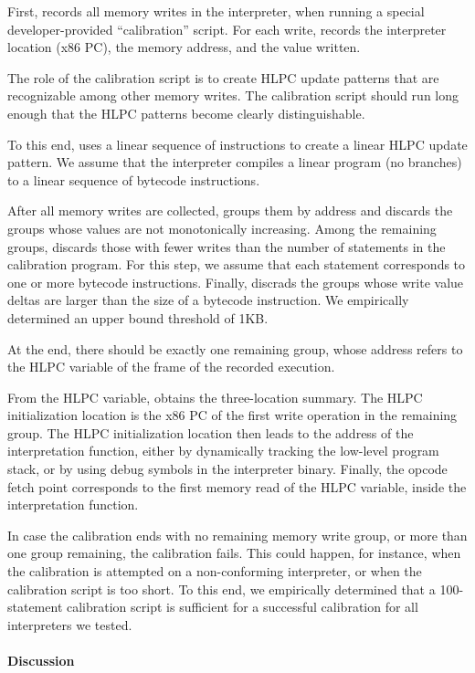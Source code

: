 First, \chef records all memory writes in the interpreter, when running a special developer-provided ``calibration'' script.
%
For each write, \chef records the interpreter location (x86 PC), the memory address, and the value written.

The role of the calibration script is to create HLPC update patterns that are recognizable among other memory writes.
%
The calibration script should run long enough that the HLPC patterns become clearly distinguishable.

To this end, \chef uses a linear sequence of instructions to create a linear HLPC update pattern.
%
We assume that the interpreter compiles a linear program (no branches) to a linear sequence of bytecode instructions.

After all memory writes are collected, \chef groups them by address and discards the groups whose values are not monotonically increasing.
%
Among the remaining groups, \chef discards those with fewer writes than the number of statements in the calibration program.  For this step, we assume that each statement corresponds to one or more bytecode instructions.
%
Finally, \chef discrads the groups whose write value deltas are larger than the size of a bytecode instruction.  We empirically determined an upper bound threshold of 1KB.

At the end, there should be exactly one remaining group, whose address refers to the HLPC variable of the frame of the recorded execution.

From the HLPC variable, \chef obtains the three-location summary.
%
The HLPC initialization location is the x86 PC of the first write operation in the remaining group.
%
The HLPC initialization location then leads to the address of the interpretation function, either by dynamically tracking the low-level program stack, or by using debug symbols in the interpreter binary.
%
Finally, the opcode fetch point corresponds to the first memory read of the HLPC variable, inside the interpretation function.

In case the calibration ends with no remaining memory write group, or more than one group remaining, the calibration fails.
%
This could happen, for instance, when the calibration is attempted on a non-conforming interpreter, or when the calibration script is too short.  To this end, we empirically determined that a 100-statement calibration script is sufficient for a successful calibration for all interpreters we tested.

\paragraph{Discussion}


